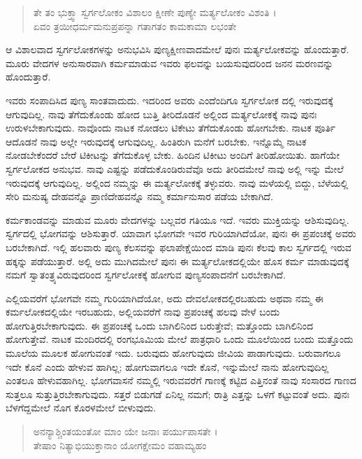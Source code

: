 \begin{verse}
ತೇ ತಂ ಭುಕ್ತ್ವಾ ಸ್ವರ್ಗಲೋಕಂ ವಿಶಾಲಂ ಕ್ಷೀಣೇ ಪುಣ್ಯೇ ಮರ್ತ್ಯಲೋಕಂ ವಿಶಂತಿ ।\\ಏವಂ ತ್ರಯೀಧರ್ಮಮನುಪ್ರಪನ್ನಾ ಗತಾಗತಂ ಕಾಮಕಾಮಾ ಲಭಂತೇ 
\end{verse}

{\small ಆ ವಿಶಾಲವಾದ ಸ್ವರ್ಗಲೋಕಗಳನ್ನು ಅನುಭವಿಸಿ ಪುಣ್ಯಕ್ಷೀಣವಾದಮೇಲೆ ಪುನಃ ಮರ್ತ್ಯಲೋಕವನ್ನು ಹೊಂದುತ್ತಾರೆ. ಮೂರು ವೇದಗಳ ಅನುಸಾರವಾಗಿ ಕರ್ಮಮಾಡುವ ಇವರು ಫಲವನ್ನು ಬಯಸುವುದರಿಂದ ಜನನ ಮರಣವನ್ನು ಹೊಂದುತ್ತಾರೆ.}

ಇವರು ಸಂಪಾದಿಸಿದ ಪುಣ್ಯ ಸಾಂತವಾದುದು. ಇದರಿಂದ ಅವರು ಎಂದೆಂದಿಗೂ ಸ್ವರ್ಗಲೋಕ ದಲ್ಲಿ ಇರುವುದಕ್ಕೆ ಆಗುವುದಿಲ್ಲ. ನಾವು ತೆಗೆದುಕೊಂಡು ಹೋದ ಬುತ್ತಿ ತೀರಿದೊಡನೆ ಅಲ್ಲಿಂದ ಮರ್ತ್ಯಲೋಕಕ್ಕೆ ನಾವು ಪುನಃ ಉರುಳಬೇಕಾಗುವುದು. ನಾವೊಂದು ನಾಟಕ ನೋಡಲು ಟಿಕೇಟು ತೆಗೆದುಕೊಂಡು ಹೋಗಬೇಕು. ನಾಟಕ ಪೂರ್ತಿ ಆದೊಡನೆ ನಾವು ಅಲ್ಲೇ ಇರುವುದಕ್ಕೆ ಆಗುವುದಿಲ್ಲ. ಹಿಂತಿರುಗಿ ಮನೆಗೆ ಬರಬೇಕು. ಇನ್ನೊಮ್ಮೆ ನಾಟಕ ನೋಡಬೇಕೆಂದರೆ ಬೇರೆ ಟಿಕೀಟನ್ನು ತೆಗೆದುಕೊಳ್ಳ ಬೇಕು. ಹಿಂದಿನ ಟಿಕೀಟು ಅಂದಿಗೆ ತೀರಿಹೋಯಿತು. ಹಾಗೆಯೇ ಸ್ವರ್ಗಲೋಕದ ಅನುಭವ. ನಾವು ಎಷ್ಟನ್ನು ಪಡೆದುಕೊಂಡಿರುವೆವೊ ಅದು ತೀರಿದಮೇಲೆ ನಾವು ಅಲ್ಲಿ ಇನ್ನು ಮೇಲೆ ಇರುವುದಕ್ಕೆ ಆಗುವುದಿಲ್ಲ. ಅಲ್ಲಿಂದ ನಮ್ಮನ್ನು ಈ ಮರ್ತ್ಯಲೋಕಕ್ಕೆ ತಳ್ಳುವರು. ನಾವು ಮಳೆಯಲ್ಲಿ ಬಿದ್ದು, ಬೆಳೆಯಲ್ಲಿ ಸೇರಿ ಮನುಷ್ಯ ದೇಹವನ್ನೊ ಪ್ರಾಣಿದೇಹವನ್ನೊ ನಮ್ಮ ಕರ್ಮಾನುಸಾರ ಪಡೆಯ ಬೇಕಾಗಿದೆ.

ಕರ್ಮಕಾಂಡವನ್ನು ಮಾಡುವ ಮೂರು ವೇದಗಳನ್ನು ಬಲ್ಲವರ ಗತಿಯೂ ಇದೆ. ಇವರು ಮುಕ್ತಿಯನ್ನು ಆಶಿಸುವುದಿಲ್ಲ. ಸ್ವರ್ಗದಲ್ಲಿ ಭೋಗವನ್ನು ಆಶಿಸುತ್ತಾರೆ. ಯಾವಾಗ ಭೋಗವೇ ಇವರ ಗುರಿಯಾಗಿದೆಯೋ, ಪುನಃ ಈ ಪ್ರಪಂಚಕ್ಕೆ ಅವರು ಬರಬೇಕಾಗಿದೆ. ಇಲ್ಲಿ ಹಲವಾರು ಪುಣ್ಯ ಕೆಲಸವನ್ನು ಫಲಾಪೇಕ್ಷೆಯಿಂದ ಮಾಡಿ ಪುನಃ ಕೆಲವು ಕಾಲ ಸ್ವರ್ಗದಲ್ಲಿ ಇರುವ ಹಕ್ಕನ್ನು ಪಡೆಯುತ್ತಾರೆ. ಅಲ್ಲಿ ಅದು ಮುಗಿದಮೇಲೆ ಪುನಃ ಈ ಮರ್ತ್ಯಲೋಕದಲ್ಲಿಯೇ ಹೊಸ ಕರ್ಮ ಮಾಡುವುದಕ್ಕೆ ನಮಗೆ ಸ್ವಾತಂತ್ರ್ಯವಿರುವುದರಿಂದ ಸ್ವರ್ಗಲೋಕಕ್ಕೆ ಹೋಗುವ ಪುಣ್ಯಸಂಪಾದನೆಗೆ ಬರಬೇಕಾಗಿದೆ.

ಎಲ್ಲಿಯವರೆಗೆ ಭೋಗವೇ ನಮ್ಮ ಗುರಿಯಾಗಿದೆಯೋ, ಅದು ದೇವಲೋಕದಲ್ಲಿರಬಹುದು ಅಥವಾ ನಮ್ಮ ಈ ಕರ್ಮಲೋಕದಲ್ಲಿಯೇ ಇರಬಹುದು, ಅಲ್ಲಿಯವರೆಗೆ ನಾವು ಪ್ರಪಂಚಕ್ಕೆ ಹಲವು ವೇಳೆ ಬಂದು ಹೋಗುತ್ತಿರಬೇಕಾಗುವುದು. ಈ ಪ್ರಪಂಚಕ್ಕೆ ಒಂದು ಬಾಗಿಲಿನಿಂದ ಬರುತ್ತೇವೆ; ಮತ್ತೊಂದು ಬಾಗಿಲಿನಿಂದ ಹೋಗುತ್ತೇವೆ. ನಾಟಕ ಮಂದಿರದಲ್ಲಿ ರಂಗಭೂಮಿಯ ಮೇಲೆ ಪಾತ್ರಧಾರಿ ಒಂದು ಮೂಲೆಯಿಂದ ಬಂದು ಮತ್ತೊಂದು ಮೂಲೆಯ ಮೂಲಕ ಹೋಗುವಂತೆ ಇದು. ಬರುವುದು ಹೋಗುವುದು ಜೀವಿಯ ಪಾಡಾಗುವುದು. ಬರುವಾಗಲೂ ಇದೇ ಕೊನೆ ಎಂದು ಹೇಳುವ ಹಾಗಿಲ್ಲ; ಹೋಗುವಾಗಲೂ ಇದೇ ಕೊನೆ, ಇನ್ನುಮೇಲೆ ನಾನು ಹೋಗುವುದಿಲ್ಲ ಎಂತಲೂ ಹೇಳುವಹಾಗಿಲ್ಲ. ಭೋಗವಾಸನೆ ನಮ್ಮಲ್ಲಿ ಇರುವವರೆಗೆ ಗಾಣಕ್ಕೆ ಕಟ್ಟಿದ ಎತ್ತಿನಂತೆ ನಾವು ಸಂಸಾರದ ಗಾಣದ ಸುತ್ತಲೂ ಸುತ್ತುತ್ತಿರಬೇಕಾಗುವುದು. ಸತ್ತರೆ ಬಿಡುಗಡೆ ಏನಿಲ್ಲ ನಮಗೆ; ರಾತ್ರಿ ಎತ್ತನ್ನು ಒಳಗೆ ಕಟ್ಟುವಂತೆ ಅದು. ಪುನಃ ಬೆಳಗೆದ್ದಮೇಲೆ ನೊಗ ಕೊರಳಮೇಲೆ ಬೀಳುವುದು.

\begin{verse}
ಅನನ್ಯಾಶ್ಚಿಂತಯಂತೋ ಮಾಂ ಯೇ ಜನಾಃ ಪರ್ಯುಪಾಸತೇ ।\\ತೇಷಾಂ ನಿತ್ಯಾಭಿಯುಕ್ತಾನಾಂ ಯೋಗಕ್ಷೇಮಂ ವಹಾಮ್ಯಹಂ 
\end{verse}

